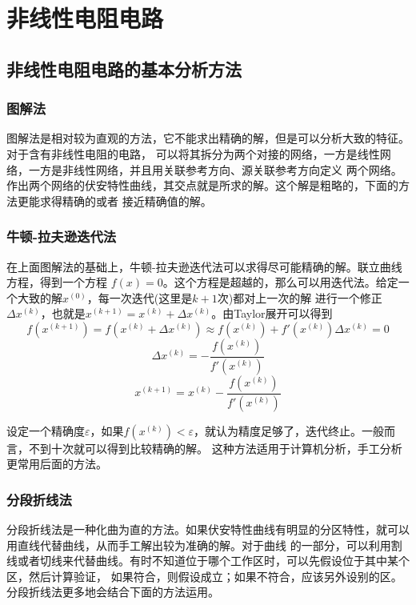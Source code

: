 \documentclass[UTF8,openany]{ctexbook}
\begin{document}
    
    \chapter{非线性电阻电路}

    \section{非线性电阻电路的基本分析方法}
    \subsection{图解法}
    \par 图解法是相对较为直观的方法，它不能求出精确的解，但是可以分析大致的特征。对于含有非线性电阻的电路，
    可以将其拆分为两个对接的网络，一方是线性网络，一方是非线性网络，并且用关联参考方向、源关联参考方向定义
    两个网络。作出两个网络的伏安特性曲线，其交点就是所求的解。这个解是粗略的，下面的方法更能求得精确的或者
    接近精确值的解。
    \subsection{牛顿-拉夫逊迭代法}
    \par 在上面图解法的基础上，牛顿-拉夫逊迭代法可以求得尽可能精确的解。联立曲线方程，得到一个方程
    $f(x)=0$。这个方程是超越的，那么可以用迭代法。给定一个大致的解$x^{(0)}$，每一次迭代(这里是$k+1$次)都对上一次的解
    进行一个修正$\Delta x^{(k)}$，也就是$x^{(k+1)}=x^{(k)}+\Delta x^{(k)}$。由Taylor展开可以得到
    \[
    f(x^{(k+1)})=f(x^{(k)}+\Delta x^{(k)})\approx f(x^{(k)})+f'(x^{(k)})\Delta x^{(k)}=0    
    \]
    \[
    \Delta x^{(k)}=-\frac{f(x^{(k)})}{f'(x^{(k)})}    
    \]
    \[
    x^{(k+1)}=x^{(k)}-\frac{f(x^{(k)})}{f'(x^{(k)})}  
    \]
    \par 设定一个精确度$\varepsilon$，如果$f(x^{(k)})<\varepsilon$，就认为精度足够了，迭代终止。一般而言，不到十次就可以得到比较精确的解。
    这种方法适用于计算机分析，手工分析更常用后面的方法。
    \subsection{分段折线法}
    \par 分段折线法是一种化曲为直的方法。如果伏安特性曲线有明显的分区特性，就可以用直线代替曲线，从而手工解出较为准确的解。对于曲线
    的一部分，可以利用割线或者切线来代替曲线。有时不知道位于哪个工作区时，可以先假设位于其中某个区，然后计算验证，
    如果符合，则假设成立；如果不符合，应该另外设别的区。分段折线法更多地会结合下面的方法运用。
\end{document}
